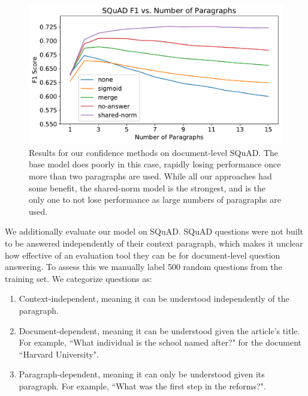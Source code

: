 \documentclass[11pt,a4paper]{article}
\begin{document}
\begin{figure}
\includegraphics[width=\columnwidth]{figures/document_squad_plot-eps-converted-to.pdf}
\caption{Results for our confidence methods on document-level SQuAD. The base model does poorly in this case, rapidly losing performance once more than two paragraphs are used. While all our approaches had some benefit, the shared-norm model is the strongest, and is the only one to not lose performance as large numbers of paragraphs are used.}
\label{figure:squad_plot}
\end{figure}

We additionally evaluate our model on SQuAD. SQuAD questions were not built to be answered independently of their context paragraph, which makes it unclear how effective of an evaluation tool they can be for document-level question answering. To assess this we manually label 500 random questions from the training set. 
%
%
We categorize questions as:
\begin{enumerate}
\item Context-independent, meaning it can be understood independently of the paragraph.
\item Document-dependent, meaning it can be understood given the article's title. For example, ``What individual is the school named after?" for the document ``Harvard University".
\item Paragraph-dependent, meaning it can only be understood given its paragraph. For example, ``What was the first step in the reforms?".
\end{enumerate}
\end{document}
